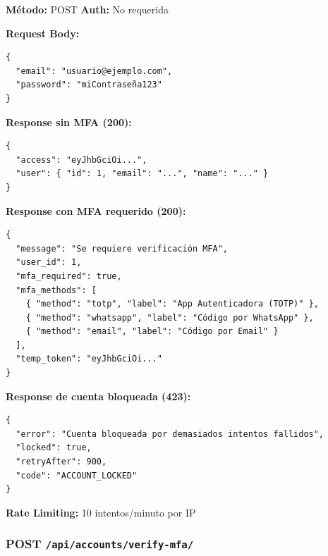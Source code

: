 \documentclass[12pt,a4paper,openany]{article}
\begin{document}
\begin{infobox}
\textbf{Método:} POST \quad \textbf{Auth:} No requerida

\textbf{Request Body:}
\begin{lstlisting}[style=jsstyle]
{
  "email": "usuario@ejemplo.com",
  "password": "miContraseña123"
}
\end{lstlisting}

\textbf{Response sin MFA (200):}
\begin{lstlisting}[style=jsstyle]
{
  "access": "eyJhbGciOi...",
  "user": { "id": 1, "email": "...", "name": "..." }
}
\end{lstlisting}

\textbf{Response con MFA requerido (200):}
\begin{lstlisting}[style=jsstyle]
{
  "message": "Se requiere verificación MFA",
  "user_id": 1,
  "mfa_required": true,
  "mfa_methods": [
    { "method": "totp", "label": "App Autenticadora (TOTP)" },
    { "method": "whatsapp", "label": "Código por WhatsApp" },
    { "method": "email", "label": "Código por Email" }
  ],
  "temp_token": "eyJhbGciOi..."
}
\end{lstlisting}

\textbf{Response de cuenta bloqueada (423):}
\begin{lstlisting}[style=jsstyle]
{
  "error": "Cuenta bloqueada por demasiados intentos fallidos",
  "locked": true,
  "retryAfter": 900,
  "code": "ACCOUNT_LOCKED"
}
\end{lstlisting}

\textbf{Rate Limiting:} 10 intentos/minuto por IP
\end{infobox}

\subsubsection{POST \texttt{/api/accounts/verify-mfa/}}
\end{document}
